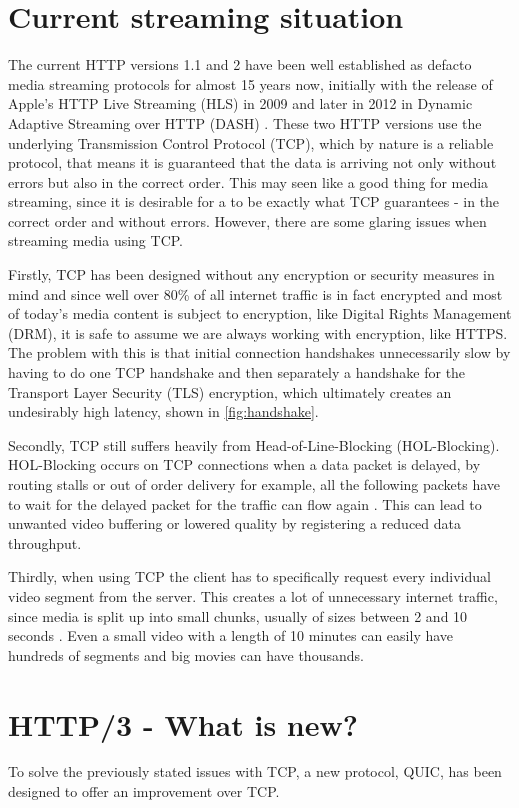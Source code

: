 \documentclass[conference]{IEEEtran}
\begin{document}
\section{Current streaming situation}
The current HTTP versions 1.1 and 2 have been well established as defacto media streaming protocols for almost 15 years now, initially with the release of Apple's HTTP Live Streaming (HLS) in 2009 \cite{b4} and later in 2012 in Dynamic Adaptive Streaming over HTTP (DASH) \cite{b5}. These two HTTP versions use the underlying Transmission Control Protocol (TCP), which by nature is a reliable protocol, that means it is guaranteed that the data is arriving not only without errors but also in the correct order. This may seen like a good thing for media streaming, since it is desirable for a to be exactly what TCP guarantees - in the correct order and without errors. However, there are some glaring issues when streaming media using TCP. 

Firstly, TCP has been designed without any encryption or security measures in mind and since well over 80\% of all internet traffic is in fact encrypted \cite{b6} and most of today's media content is subject to encryption, like Digital Rights Management (DRM), it is safe to assume we are always working with encryption, like HTTPS. The problem with this is that initial connection handshakes unnecessarily slow by having to do one TCP handshake and then separately a handshake for the Transport Layer Security (TLS) encryption, which ultimately creates an undesirably high latency, shown in \cref{fig:handshake}.

Secondly, TCP still suffers heavily from Head-of-Line-Blocking (HOL-Blocking). HOL-Blocking occurs on TCP connections when a data packet is delayed, by routing stalls or out of order delivery for example, all the following packets have to wait for the delayed packet for the traffic can flow again \cite{b7}. This can lead to unwanted video buffering or lowered quality by registering a reduced data throughput.

Thirdly, when using TCP the client has to specifically request every individual video segment from the server. This creates a lot of unnecessary internet traffic, since media is split up into small chunks, usually of sizes between 2 and 10 seconds \cite{b8}. Even a small video with a length of 10 minutes can easily have hundreds of segments and big movies can have thousands.

\section{HTTP/3 - What is new?}
To solve the previously stated issues with TCP, a new protocol, QUIC, has been designed to offer an improvement over TCP. 
\end{document}
